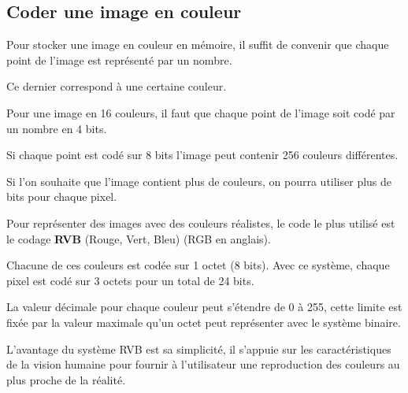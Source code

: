 \documentclass[11pt, a4paper]{book}
\begin{document}
\subsection{Coder une image en couleur}

Pour stocker une image en couleur en mémoire, il suffit de convenir que chaque point de l’image est représenté par un nombre. 

Ce dernier correspond à une certaine couleur.

Pour une image en 16 couleurs, il faut que chaque point de l’image soit codé par un nombre en 4 bits.

Si chaque point est codé sur 8 bits l’image peut contenir 256 couleurs différentes.

Si l'on souhaite que l'image contient plus de couleurs, on pourra utiliser plus de bits pour chaque pixel.

Pour représenter des images avec des couleurs réalistes,
le code le plus utilisé est le codage {\bf RVB} (Rouge, Vert, Bleu) (RGB en anglais). 

Chacune de ces couleurs est codée sur 1 octet (8 bits). 
Avec ce système, chaque pixel est codé sur 3 octets pour un total de 24 bits. 

La valeur décimale pour chaque couleur peut s’étendre de 0 à 255, cette limite est fixée par la valeur maximale qu’un octet peut représenter avec le système binaire.

L’avantage du système RVB est sa simplicité, 
il s’appuie sur les caractéristiques de la vision humaine pour fournir à l’utilisateur une reproduction des couleurs au plus proche de la réalité.
\end{document}
